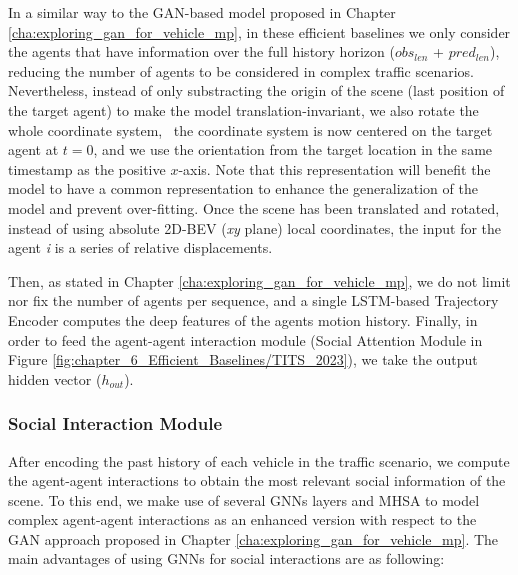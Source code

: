 In a similar way to the \ac{GAN}-based model proposed in Chapter \ref{cha:exploring_gan_for_vehicle_mp}, in these efficient baselines we only consider the agents that have information over the full history horizon (\textit{$obs_{len}$} + \textit{$pred_{len}$}), reducing the number of agents to be considered in complex traffic scenarios. Nevertheless, instead of only substracting the origin of the scene (last position of the target agent) to make the model translation-invariant, we also rotate the whole coordinate system, \ie \ the coordinate system is now centered on the target agent at $t = 0$, and we use the orientation from the target location in the same timestamp as the positive $x$-axis. Note that this representation will benefit the model to have a common representation to enhance the generalization of the model and prevent over-fitting. Once the scene has been translated and rotated, instead of using absolute 2D-\ac{BEV} (\textit{xy} plane) local coordinates, the input for the agent \textit{i} is a series of relative displacements.

Then, as stated in Chapter \ref{cha:exploring_gan_for_vehicle_mp}, we do not limit nor fix the number of agents per sequence, and a single \ac{LSTM}-based Trajectory Encoder computes the deep features of the agents motion history. Finally, in order to feed the agent-agent interaction module (Social Attention Module in Figure \ref{fig:chapter_6_Efficient_Baselines/TITS_2023}), we take the output hidden vector ($h_{out}$).

\subsubsection{Social Interaction Module}
\label{subsubsec:6_efficient_baselines_social_interactions}

After encoding the past history of each vehicle in the traffic scenario, we compute the agent-agent interactions to obtain the most relevant social information of the scene. To this end, we make use of several \acp{GNN} layers and \ac{MHSA} to model complex agent-agent interactions as an enhanced version with respect to the \ac{GAN} approach proposed in Chapter \ref{cha:exploring_gan_for_vehicle_mp}. The main advantages of using \acp{GNN} for social interactions are as following:

